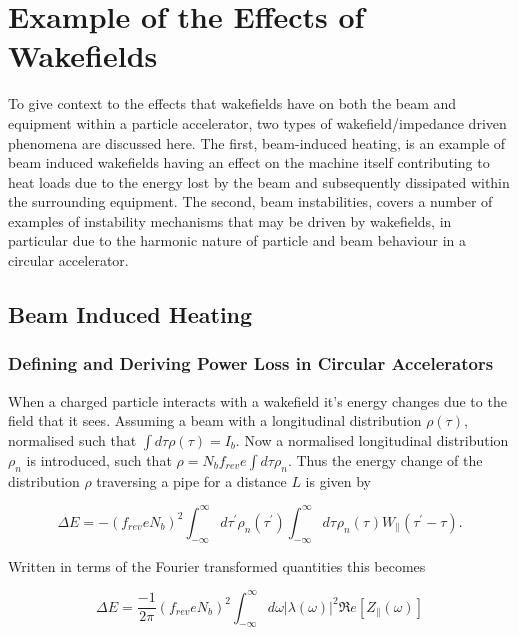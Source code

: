 \section{Example of the Effects of Wakefields}

To give context to the effects that wakefields have on both the beam and equipment within a particle accelerator, two types of wakefield/impedance driven phenomena are discussed here. The first, beam-induced heating, is an example of beam induced wakefields having an effect on the machine itself contributing to heat loads due to the energy lost by the beam and subsequently dissipated within the surrounding equipment. The second, beam instabilities, covers a number of examples of instability mechanisms that may be driven by wakefields, in particular due to the harmonic nature of particle and beam behaviour in a circular accelerator.

\subsection{Beam Induced Heating}
\label{sec:beam_induced_heating}

\subsubsection{Defining and Deriving Power Loss in Circular Accelerators}
\label{sec:power_loss}

When a charged particle interacts with a wakefield it's energy changes due to the field that it sees. Assuming a beam with a longitudinal distribution $\rho (\tau)$, normalised such that $\int d \tau \rho (\tau ) = I_{b}$. Now a normalised longitudinal distribution $\rho_{n}$ is introduced, such that $\rho = N_{b} f_{rev} e \int d \tau \rho_{n}$. Thus the energy change of the distribution $\rho$ traversing a pipe for a distance $L$ is given by \cite{Chao:PhysColEff, Ng:IntDepInstab}

\begin{equation}
\Delta E = - \left( f_{rev} e N_{b}\right)^{2} \int^{\infty}_{-\infty} d\tau^{'} \rho_{n} \left( \tau^{'} \right) \int^{\infty}_{-\infty} d\tau^{} \rho_{n} \left( \tau^{} \right) W_{\parallel} \left( \tau^{'} - \tau \right).  
\end{equation}

Written in terms of the Fourier transformed quantities this becomes

\begin{equation}
\Delta E = \frac{-1}{2\pi}\left( f_{rev} e N_{b}\right)^{2} \int^{\infty}_{-\infty} d\omega \left| \lambda \left( \omega \right)  \right|^{2} \Re{}e \left[ Z_{\parallel} \left( \omega \right) \right]
\end{equation}

